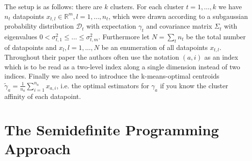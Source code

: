 \documentclass[10pt,a4paper]{article}
\begin{document}
The setup is as follows: there are $k$ clusters.
For each cluster $t = 1, \dots, k$ we have $n_{t}$ datapoints $x_{t, l} \in \mathbb{R}^{m}, l = 1, \dots, n_{t}$, which were drawn according to a subgaussian probability distribution $\mathcal{D}_{t}$ with expectation $\gamma_{t}$ and covariance matrix $\Sigma_{t}$ with eigenvalues $0 < \sigma_{t, 1}^{2} \le \dots \le \sigma_{t, m}^{2}$.
Furthermore let $N = \sum_{t} n_{t}$ be the total number of datapoints and $x_{l}, l = 1, \dots, N$ be an enumeration of all datapoints $x_{t, l}$.
Throughout their paper the authors often use the notation $(a, i)$ as an index which is to be read as a two-level index along a single dimension instead of two indices.
Finally we also need to introduce the k-means-optimal centroids $\tilde{\gamma}_{a} = \frac{1}{n_{a}} \sum_{i = 1}^{n_{a}} x_{a, i}$, i.e. the optimal estimators for $\gamma_{a}$ if you know the cluster affinity of each datapoint.

\section{The Semidefinite Programming Approach}
\label{sec:approach}
\end{document}
